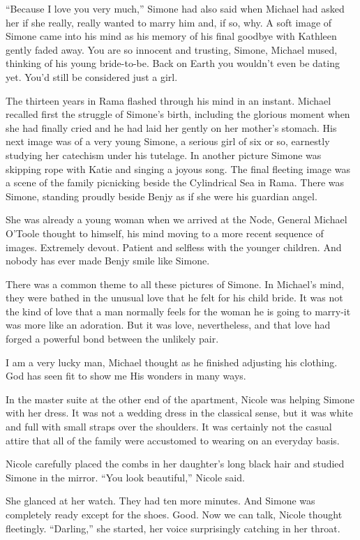 \documentclass[]{article}
\begin{document}
{“Because I love you very much,” Simone had also said when Michael had asked her if she really, really wanted to marry him and, if so, why.  A soft image of Simone came into his mind as his memory of his final goodbye with Kathleen gently faded away.  You are so innocent and trusting, Simone, Michael mused, thinking of his young bride-to-be.  Back on Earth you wouldn’t even be dating yet.  You’d still be considered just a girl.

The thirteen years in Rama flashed through his mind in an instant.  Michael recalled first the struggle of Simone’s birth, including the glorious moment when she had finally cried and he had laid her gently on her mother’s stomach.  His next image was of a very young Simone, a serious girl of six or so, earnestly studying her catechism under his tutelage.  In another picture Simone was skipping rope with Katie and singing a joyous song.  The final fleeting image was a scene of the family picnicking beside the Cylindrical Sea in Rama.  There was Simone, standing proudly beside Benjy as if she were his guardian angel.

She was already a young woman when we arrived at the Node, General Michael O’Toole thought to himself, his mind moving to a more recent sequence of images.  Extremely devout.  Patient and selfless with the younger children.  And nobody has ever made Benjy smile like Simone.

There was a common theme to all these pictures of Simone.  In Michael’s mind, they were bathed in the unusual love that he felt for his child bride.  It was not the kind of love that a man normally feels for the woman he is going to marry-it was more like an adoration.  But it was love, nevertheless, and that love had forged a powerful bond between the unlikely pair.

I am a very lucky man, Michael thought as he finished adjusting his clothing.  God has seen fit to show me His wonders in many ways.

In the master suite at the other end of the apartment, Nicole was helping Simone with her dress.  It was not a wedding dress in the classical sense, but it was white and full with small straps over the shoulders.  It was certainly not the casual attire that all of the family were accustomed to wearing on an everyday basis.

Nicole carefully placed the combs in her daughter’s long black hair and studied Simone in the mirror.  “You look beautiful,” Nicole said.

She glanced at her watch.  They had ten more minutes.  And Simone was completely ready except for the shoes.  Good.  Now we can talk, Nicole thought fleetingly.  “Darling,” she started, her voice surprisingly catching in her throat.

}
\end{document}
